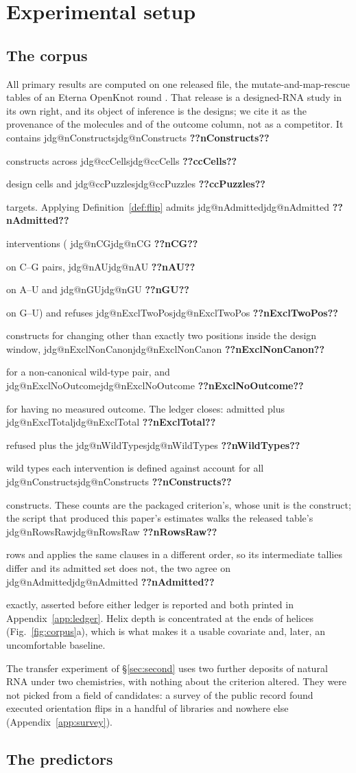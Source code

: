 \documentclass[11pt]{article}
\makeatletter
\newcommand{\jdg}[1]{%
  \ifcsname jdg@#1\endcsname\csname jdg@#1\endcsname
  \else\textbf{??#1??}\PackageError{nm}{undefined measured quantity #1}{}\fi}
\makeatother
\begin{document}
\section{Experimental setup}
\label{sec:setup}

\subsection{The corpus}
\label{sec:corpus}

All primary results are computed on one released file, the mutate-and-map-rescue tables of an
Eterna OpenKnot round \citep{townley2026pseudoknots}. That release is a designed-RNA study in its
own right, and its object of inference is the designs; we cite it as the provenance of the
molecules and of the outcome column, not as a competitor. It contains \jdg{nConstructs} constructs across \jdg{ccCells} design cells and \jdg{ccPuzzles}
targets. Applying Definition~\ref{def:flip} admits \jdg{nAdmitted} interventions (\jdg{nCG} on
C--G pairs, \jdg{nAU} on A--U and \jdg{nGU} on G--U) and refuses \jdg{nExclTwoPos} constructs
for changing other than exactly two positions inside the design window, \jdg{nExclNonCanon} for a
non-canonical wild-type pair, and \jdg{nExclNoOutcome} for having no measured outcome. The ledger
closes: admitted plus \jdg{nExclTotal} refused plus the \jdg{nWildTypes} wild types each
intervention is defined against account for all \jdg{nConstructs} constructs. These counts are the
packaged criterion's, whose unit is the construct; the script that produced this paper's estimates
walks the released table's \jdg{nRowsRaw} rows and applies the same clauses in a different order,
so its intermediate tallies differ and its admitted set does not, the two agree on
\jdg{nAdmitted} exactly, asserted before either ledger is reported and both printed in
Appendix~\ref{app:ledger}. Helix depth is concentrated at the ends of helices
(Fig.~\ref{fig:corpus}a), which is what makes it a usable covariate and, later, an uncomfortable
baseline.

The transfer experiment of \S\ref{sec:second} uses two further deposits of natural RNA under two
chemistries, with nothing about the criterion altered. They were not picked from a field of
candidates: a survey of the public record found executed orientation flips in a handful of
libraries and nowhere else (Appendix~\ref{app:survey}).

\subsection{The predictors}
\label{sec:predictors}
\end{document}
